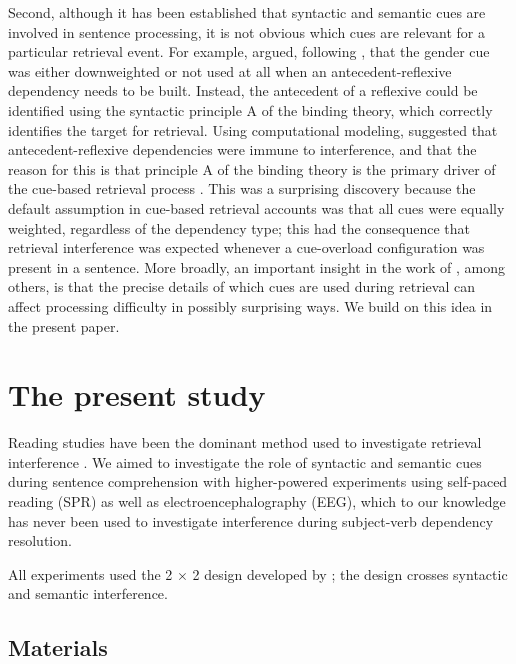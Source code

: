 \documentclass[review,preprint,12pt,authoryear,floatsintext]{elsarticle}
\begin{document}
Second, although it has been established \citep[e.g.,][]{vandyke07,mertzen} that syntactic and semantic cues are involved in sentence processing, it is not obvious which cues are relevant for a particular retrieval event. For example, \cite{dillon2013} argued, following \cite{Sturt2003}, that the gender cue was either downweighted or not used at all when an antecedent-reflexive dependency needs to be built. Instead, the antecedent of a reflexive could be identified using the syntactic principle A of the binding theory, which correctly identifies the target for retrieval.  Using computational modeling, \cite{dillon2013} suggested that antecedent-reflexive dependencies were immune to interference, and that the reason for this is that principle A of the binding theory is the primary driver of the cue-based retrieval process \citep[cf. ][]{jaeger_etal_2020,yadav2021individual}. This was a surprising discovery because the default assumption in cue-based retrieval accounts was that all cues were equally weighted, regardless of the dependency type; this had the consequence that retrieval interference was expected whenever a cue-overload configuration was present in a sentence. More broadly, an important insight in the work of \cite{dillon2013}, among others, is that  the precise details of which cues are used during retrieval can affect processing difficulty in possibly surprising ways. We build on this idea in the present paper.

\section{The present study}

Reading studies have been the dominant method used to investigate retrieval interference \citep[see the review in][]{jaeger_etal_2017}. We aimed to investigate the role of syntactic and semantic cues during sentence comprehension with higher-powered experiments using  self-paced reading (SPR) as well as electroencephalography (EEG), which to our knowledge has never been used to investigate interference during subject-verb dependency resolution.

{All experiments used the 2 $\times$ 2 design developed by \cite{vandyke07}; the design crosses syntactic and semantic interference.} \label{vd_design}

\subsection{Materials}
\end{document}
